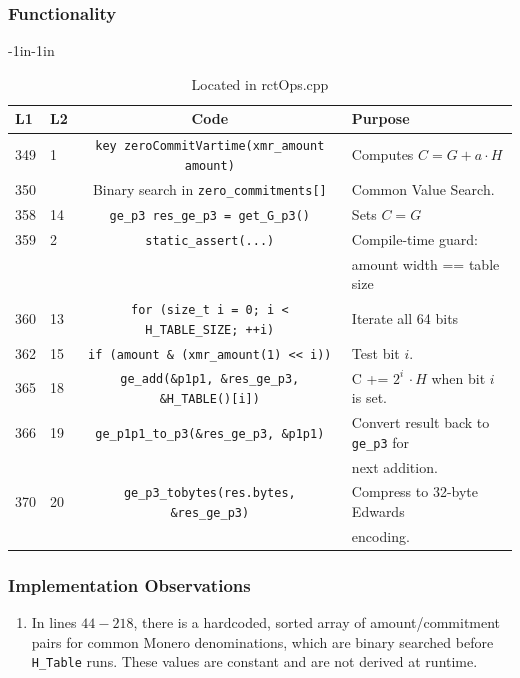 \documentclass[12pt,titlepage,table]{article}
\begin{document}
\subsubsection{Functionality}

\newpage
\begin{table}[htbp]
\caption{zeroCommitVartime Source To Spec Map}
\begin{adjustwidth}{-1in}{-1in}
\centering
{
\begin{tabular}{| l | l | c | l |}
\hline
\textbf{L1} & \textbf{L2} & \textbf{Code} & \textbf{Purpose} \\
\hline
\hline
349 & 1 &\verb+key zeroCommitVartime(xmr_amount amount)+ & Computes $C = G + a \cdot H$ \\
350 &  & Binary search in \verb+zero_commitments[]+ &  Common Value Search. \\
358 & 14 &\verb|ge_p3 res_ge_p3 = get_G_p3()| & Sets $C = G$\\
359 & 2 & \verb+static_assert(...)+ & Compile-time guard:\\
&&& amount width == table size \\
360 & 13 &\verb|for (size_t i = 0; i < H_TABLE_SIZE; ++i)| & Iterate all 64 bits \\
362 & 15 &\verb+if (amount & (xmr_amount(1) << i))+ & Test bit $i$. \\
365 & 18 &\verb+ge_add(&p1p1, &res_ge_p3, &H_TABLE()[i])+ & C += $2^i \, \cdot H$ when bit $i$ is set.\\
366 & 19 &\verb+ge_p1p1_to_p3(&res_ge_p3, &p1p1)+ & Convert result back to \verb+ge_p3+ for\\
&&& next addition.\\
370 & 20 &\verb+ge_p3_tobytes(res.bytes, &res_ge_p3)+ & Compress to 32-byte Edwards\\ 
&&& encoding.\\
\hline
\end{tabular}}
\end{adjustwidth}
\caption*{Located in rctOps.cpp}
\end{table}

\subsubsection{Implementation Observations}
\begin{enumerate}
\item In lines $44-218$, there is a hardcoded, sorted array of amount/commitment pairs for common Monero denominations, which are binary searched before \verb+H_Table+ runs. These values are constant and are not derived at runtime.
\end{enumerate}
\end{document}
